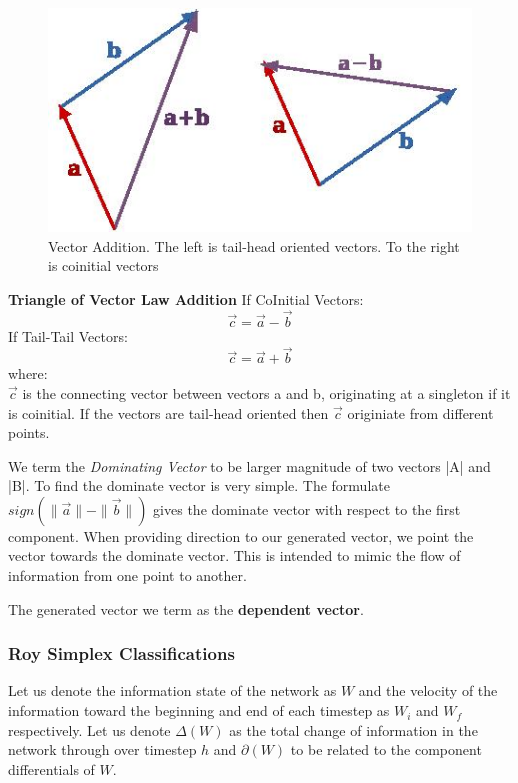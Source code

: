 \begin{figure}[H]
\includegraphics[width=\linewidth]{images/vectoraddition}
\caption{Vector Addition. The left is tail-head oriented vectors. To the right is coinitial vectors}
\label{vectoraddition} 
\end{figure}

\textbf{Triangle of Vector Law Addition}
\newline
If CoInitial Vectors:
\begin{equation}
      \vec{c} = \vec{a} - \vec{b} 
\end{equation}\newline
If Tail-Tail Vectors:
\begin{equation}
      \vec{c} = \vec{a} + \vec{b} 
\end{equation}
where:\\
$\vec{c}$ is the connecting vector between vectors a and b, originating at a singleton if it is coinitial.
If the vectors are tail-head oriented then $\vec{c}$ originiate from different points. 
\par We term the \textit{Dominating Vector} to be larger magnitude of two vectors |A| and |B|. To find the dominate vector is very simple. The formulate $sign(\|\vec{a}\| - \|\vec{b}\|)$ gives the dominate vector with respect to the first component. When providing direction to our generated vector, we point the vector towards the dominate vector. This is intended to mimic the flow of information from one point to another.

The generated vector we term as the \textbf{dependent vector}.

\subsubsection{Roy Simplex Classifications}

Let us denote the information state of the network as $W$ and the velocity of the information toward the beginning and end of each timestep as $W_i$ and $W_f$ respectively. Let us denote $\Delta(W)$ as the total change of information in the network through over timestep $h$ and $\partial(W)$ to be related to the component differentials of $W$.

